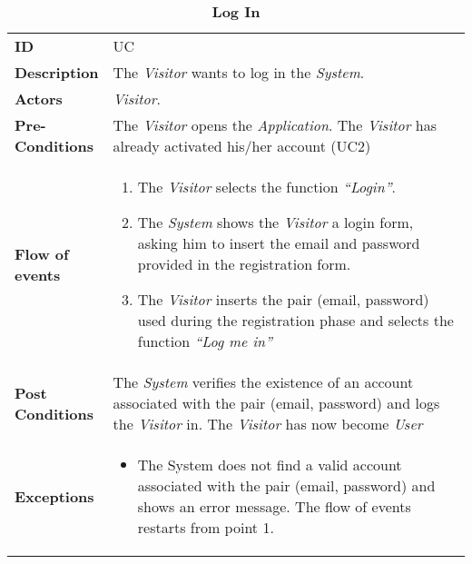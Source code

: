 \begin{longtable}{|p{0.2\linewidth} | p{0.8\linewidth}|}
	\captionsetup{labelformat=empty} %
	\caption{\textbf{Log In}} %
	\label{UC_Login}%
	\\ \hline %
	
	\textbf{ID} & UC\theUseCaseIdCounter \\ \hline
	\textbf{Description} & The \emph{Visitor} wants to log in the \emph{System}. \\ \hline
	\textbf{Actors} & \emph{Visitor}.\\ \hline
	\textbf{Pre-Conditions} & The \emph{Visitor} opens the \emph{Application}. The \emph{Visitor} has already activated his/her account (UC2) \\ \hline
	\textbf{Flow of events} & 
	\begin{enumerate}
		\item The \emph{Visitor} selects the function \textit{\textquotedblleft{Login}\textquotedblright}.
		\item The \emph{System} shows the \emph{Visitor} a login form, asking him to insert the email and password provided in the registration form.
		\item The \emph{Visitor} inserts the pair (email, password) used during the registration phase and selects the function \textit{\textquotedblleft{Log me in}\textquotedblright}
	\end{enumerate}	 \\ \hline
	\textbf{Post Conditions} & The \emph{System} verifies the existence of an account associated with the pair (email, password) and logs the \emph{Visitor} in. The \emph{Visitor} has now become \emph{User}  \\ \hline
	\textbf{Exceptions} & 
	\begin{itemize}
	\item The System does not find a valid account associated with the pair (email, password) and shows an error message. The flow of events restarts from point 1.
	\end{itemize} \\ \hline
\end{longtable}


